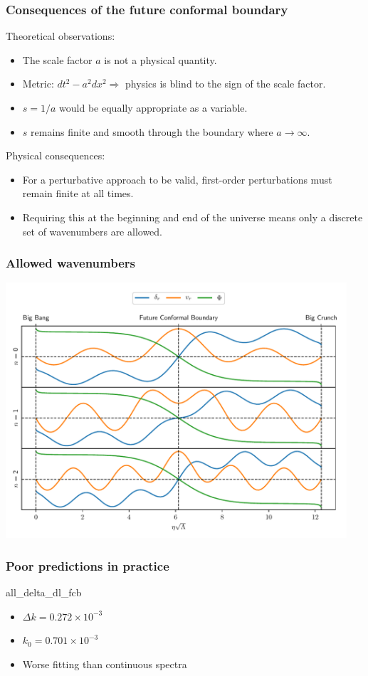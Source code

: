 \documentclass[%
]{beamer}
\begin{document}
\begin{frame}
    \frametitle{Consequences of the future conformal boundary}
    Theoretical observations:
    \begin{itemize}
        \item The scale factor $a$ is not a physical quantity.
        \item Metric: $dt^2 - a^2 dx^2 \Rightarrow$  physics is blind to the sign of the scale factor.
        \item $s = 1/a$ would be equally appropriate as a variable.
        \item $s$ remains finite and smooth through the boundary where $a\to\infty$.
    \end{itemize}
    \vspace{10pt}
    Physical consequences:
    \begin{itemize}
        \item For a perturbative approach to be valid, first-order perturbations must remain finite at all times.
        \item Requiring this at the beginning and end of the universe means only a discrete set of wavenumbers are allowed.
    \end{itemize}
\end{frame}

\begin{frame}
    \frametitle{Allowed wavenumbers}
    \centerline{
    \includegraphics[width=0.95\textwidth]{first_allowed_pert}
    }
\end{frame}

\begin{frame}
    \frametitle{Poor predictions in practice}
    \begin{figright}[0.27]{all_delta_dl_fcb}
        \begin{itemize}
            \item $\Delta k = 0.272 \times 10^{-3}$\\
            \item $k_0=0.701 \times 10^{-3}$
            \item Worse fitting than continuous spectra
        \end{itemize}
    \end{figright}
\end{frame}
\end{document}
